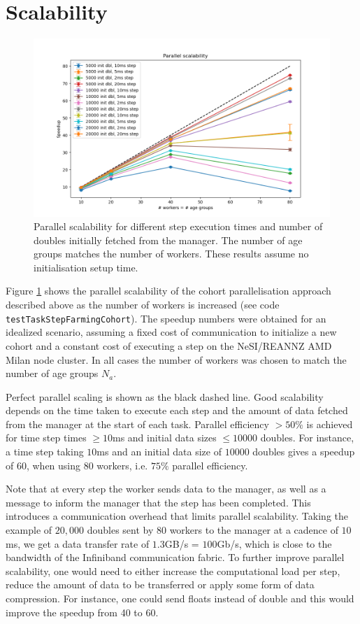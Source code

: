 \documentclass[a4paper,oneside,12pt]{article}
\begin{document}
\section{Scalability}

\begin{figure}
    \includegraphics[width=15cm]{results/speedup_vs_workers.png}
    \caption{Parallel scalability for different step execution 
    times and number of doubles initially fetched from the manager. 
    The number of age groups matches the number of workers. These results 
    assume no initialisation setup time.}
    \label{fig:speedup}
\end{figure}

Figure \ref{fig:speedup} shows the parallel scalability of the cohort parallelisation 
approach described above as the number of workers is increased (see code \verb|testTaskStepFarmingCohort|). 
The speedup numbers were obtained for an idealized scenario, assuming 
a fixed cost of communication to initialize a new cohort and a constant cost of executing a step
on the NeSI/REANNZ AMD Milan node cluster.
In all cases the number of workers was chosen to match the number of age groups $N_a$.

Perfect parallel scaling 
is shown as the black dashed line. Good scalability depends on the time taken to execute 
each step and the amount of data fetched from the manager at the start of each task. Parallel 
efficiency $> 50\%$ is achieved for time step times $\geq 10$ms and initial data sizes 
$\leq 10000$ doubles. For instance, a time step taking $10$ms and an initial data size of 
$10000$ doubles gives a speedup of 60, when using $80$ workers, i.e. $75\%$ parallel efficiency.

Note that at every step the worker sends data to the manager, as well as a message 
to inform the manager that the step has been completed. This introduces a communication overhead
that limits parallel scalability. 
Taking the example of $20,000$ doubles sent by 80 workers to the manager at a cadence of 
 $10$ms, we get a data transfer rate of $1.3$GB/s = $100$Gb/s, which is close to the bandwidth 
 of the Infiniband communication fabric. To further improve parallel scalability, one would need to 
 either increase the computational load per step, reduce the amount of data to be transferred or apply
some form of data compression. For instance, one could send floats instead of double and this would 
improve the speedup from 40 to 60. 
\end{document}
